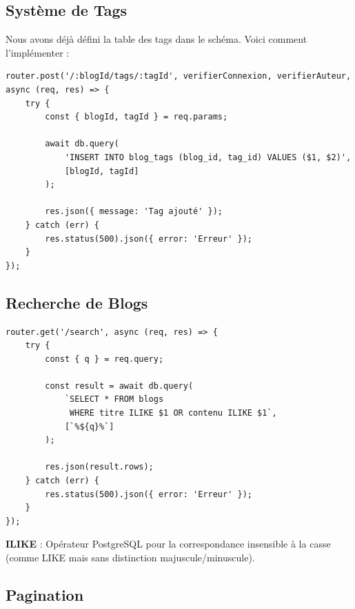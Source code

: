 \subsection{Système de Tags}

Nous avons déjà défini la table des tags dans le schéma. Voici comment l'implémenter :

\begin{lstlisting}[style=javascript, caption=Route pour ajouter un tag à un blog]
router.post('/:blogId/tags/:tagId', verifierConnexion, verifierAuteur, async (req, res) => {
    try {
        const { blogId, tagId } = req.params;
        
        await db.query(
            'INSERT INTO blog_tags (blog_id, tag_id) VALUES ($1, $2)',
            [blogId, tagId]
        );
        
        res.json({ message: 'Tag ajouté' });
    } catch (err) {
        res.status(500).json({ error: 'Erreur' });
    }
});
\end{lstlisting}

\subsection{Recherche de Blogs}

\begin{lstlisting}[style=javascript, caption=Route de recherche]
router.get('/search', async (req, res) => {
    try {
        const { q } = req.query;
        
        const result = await db.query(
            `SELECT * FROM blogs 
             WHERE titre ILIKE $1 OR contenu ILIKE $1`,
            [`%${q}%`]
        );
        
        res.json(result.rows);
    } catch (err) {
        res.status(500).json({ error: 'Erreur' });
    }
});
\end{lstlisting}

\begin{definitionbox}
    \textbf{ILIKE} : Opérateur PostgreSQL pour la correspondance insensible à la casse (comme LIKE mais sans distinction majuscule/minuscule).
\end{definitionbox}

\subsection{Pagination}

